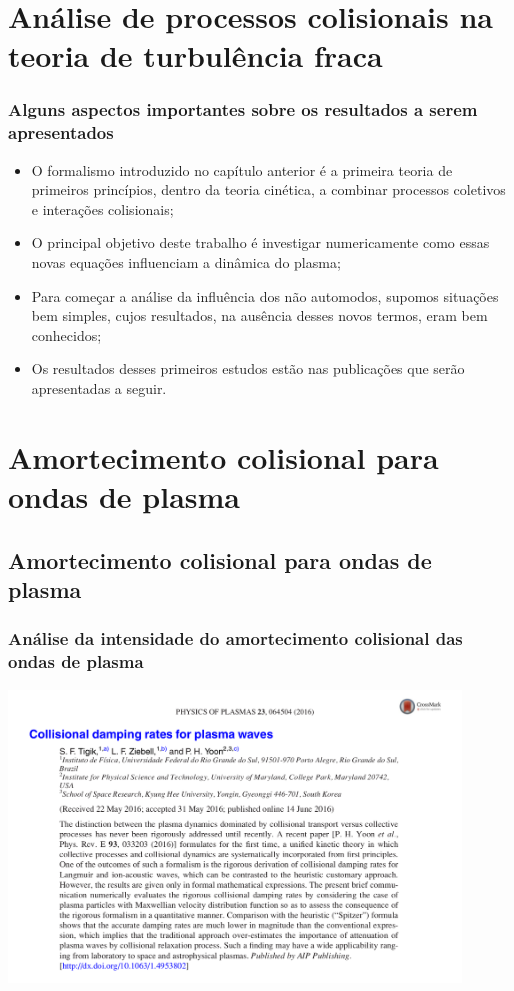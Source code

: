 \documentclass[10pt,aspectratio=1610,lualatex]{beamer}
\begin{document}
\section{Análise de processos colisionais na teoria de
  turbulência fraca}
\begin{frame}
  \frametitle{Alguns aspectos importantes sobre os resultados
  a serem apresentados}
  \begin{itemize}
    \item O formalismo introduzido no capítulo anterior é a primeira
    teoria de primeiros princípios, dentro da teoria cinética, a
    combinar processos coletivos e interações colisionais;
    \vspace{0.3cm}
    \pause
    \item O principal objetivo deste trabalho é investigar numericamente
    como essas novas equações influenciam a dinâmica do plasma;
    \vspace{0.3cm}
    \pause 
    \item Para começar a análise da influência dos não automodos,
    supomos situações bem simples, cujos resultados, na ausência desses
    novos termos, eram bem conhecidos;
    \vspace{0.3cm}
    \pause 
    \item Os resultados desses primeiros estudos estão nas
    publicações que serão apresentadas a seguir.
  \end{itemize}
\end{frame}

\section*{Amortecimento colisional para ondas de plasma}
\subsection{Amortecimento colisional para ondas de plasma}
\begin{frame}
  \frametitle{Análise da intensidade do amortecimento colisional das
    ondas de plasma}
 \centering \includegraphics[width=0.9\textwidth]{print_Tigik2016b.png}
\end{frame}
\end{document}
